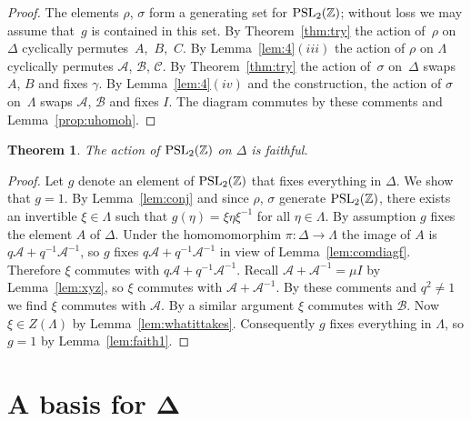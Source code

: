 \documentclass[pdftex]{sigma}
\numberwithin{equation}{section}
\newtheorem{Theorem}{Theorem}[section]
\begin{document}
\begin{proof}
The elements
$\rho$, $\sigma$ form a generating set for
${\rm  {PSL}}_2(\mathbb Z)$; without loss
we may assume that~$g$ is contained in this set.
By Theorem~\ref{thm:try}
the action of~$\rho$ on~$\Delta $
cyclically permutes~$A$,~$B$,~$C$.
By Lemma~\ref{lem:4}$(iii)$
the action of $\rho$ on $\Lambda $
cyclically permutes
$\mathcal A$, $\mathcal B$, $\mathcal C$.
By Theorem~\ref{thm:try}
the action of~$\sigma$ on~$\Delta $ swaps $A$, $B$ and f\/ixes
$\gamma$. By Lemma~\ref{lem:4}$(iv)$ and the construction,
the action of $\sigma $ on~$\Lambda $ swaps $\mathcal A$, $\mathcal B$
and f\/ixes $ I$.
The diagram commutes by these comments
and Lemma~\ref{prop:uhomoh}.
\end{proof}

\begin{Theorem}
\label{thm:faith}
The action of
${\rm  {PSL}}_2(\mathbb Z)$ on $\Delta $ is faithful.
\end{Theorem}

\begin{proof}
Let $g$ denote an element of
${\rm  {PSL}}_2(\mathbb Z)$ that f\/ixes everything in
$\Delta $.
We show that $g=1$.
By Lemma~\ref{lem:conj} and since $\rho$, $\sigma$ generate
${\rm  {PSL}}_2(\mathbb Z)$, there exists an invertible
$\xi \in \Lambda $ such that $g(\eta)=\xi \eta \xi^{-1}$ for
all $\eta  \in \Lambda $. By assumption
$g$ f\/ixes the element $A$ of $\Delta $. Under
the homomomorphim
$\pi : \Delta  \to \Lambda $ the image of $A$ is
$q\mathcal A+q^{-1}{\mathcal A}^{-1}$,
so $g$ f\/ixes
$q\mathcal A+q^{-1}{\mathcal A}^{-1}$ in view of Lemma~\ref{lem:comdiagf}. Therefore $\xi $ commutes
with
$q\mathcal A+q^{-1}{\mathcal A}^{-1}$.
Recall $\mathcal A+{\mathcal A}^{-1} =\mu I$ by
Lemma~\ref{lem:xyz}, so $\xi$ commutes with
$\mathcal A+{\mathcal A}^{-1}$.
By these comments and $q^2\not=1$ we f\/ind
$\xi$ commutes with $\mathcal A$. By a similar
argument $\xi$ commutes with $\mathcal B$. Now
$\xi \in Z(\Lambda )$ by
Lemma~\ref{lem:whatittakes}.
Consequently $g$ f\/ixes everything in $\Lambda $, so $g=1$
 by Lemma~\ref{lem:faith1}.
\end{proof}





\section[A basis for $\Delta $]{A basis for $\boldsymbol{\Delta}$}
\end{document}
